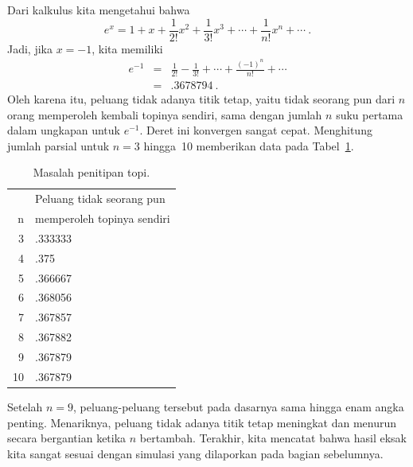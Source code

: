 \begin{example}
Dari kalkulus kita mengetahui bahwa
$$ e^x = 1 + x + \frac 1{2!}x^2 + \frac 1{3!}x^3 + \cdots + \frac 1{n!}x^n + \cdots\ .
$$ Jadi, jika $x = -1$, kita memiliki
\begin{eqnarray*} e^{-1} & = &\frac 1{2!} - \frac 1{3!} + \cdots + \frac{(-1)^n}{n!} +
\cdots \\
       & = & .3678794\ .
\end{eqnarray*} Oleh karena itu, peluang tidak adanya titik tetap, yaitu tidak seorang
pun dari $n$ orang memperoleh kembali topinya sendiri, sama dengan jumlah $n$ suku
pertama dalam ungkapan untuk $e^{-1}$.  Deret ini konvergen sangat cepat.  Menghitung
jumlah parsial untuk $n = 3$ hingga~10 memberikan data pada Tabel~\ref{table 3.7}.
\begin{table}
\centering
\begin{tabular}{rl}
      &        Peluang tidak seorang pun  \\
   n  &        memperoleh topinya sendiri \\\hline
   3  &       \hspace{.25in}.333333     \\
   4  &       \hspace{.2in} .375        \\
   5  &       \hspace{.25in}.366667     \\
   6  &       \hspace{.25in}.368056     \\
   7  &       \hspace{.25in}.367857     \\
   8  &       \hspace{.25in}.367882     \\
   9  &       \hspace{.25in}.367879     \\
  10  &       \hspace{.25in}.367879     \\\hline
\end{tabular}
\caption{Masalah penitipan topi.}
\label{table 3.7}
\end{table}
\par
Setelah $n = 9$, peluang-peluang tersebut pada dasarnya sama hingga enam angka penting.
Menariknya, peluang tidak adanya titik tetap meningkat dan menurun secara bergantian
ketika $n$ bertambah.  Terakhir, kita mencatat bahwa hasil eksak kita sangat sesuai
dengan simulasi yang dilaporkan pada bagian sebelumnya.
\end{example}

